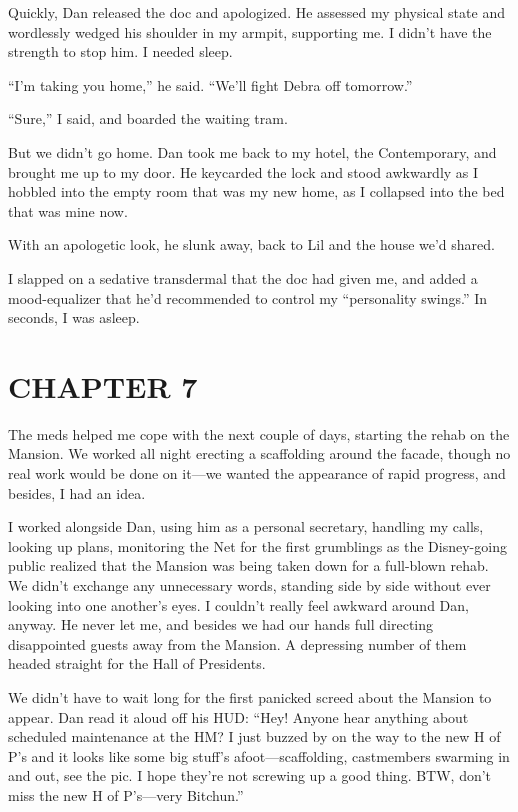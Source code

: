 Quickly, Dan released the doc and apologized. He assessed my
physical state and wordlessly wedged his shoulder in my armpit,
supporting me. I didn't have the strength to stop him. I needed
sleep.

“I'm taking you home,” he said. “We'll fight Debra off tomorrow.”

“Sure,” I said, and boarded the waiting tram.

But we didn't go home. Dan took me back to my hotel, the
Contemporary, and brought me up to my door. He keycarded the lock
and stood awkwardly as I hobbled into the empty room that was my
new home, as I collapsed into the bed that was mine now.

With an apologetic look, he slunk away, back to Lil and the house
we'd shared.

I slapped on a sedative transdermal that the doc had given me, and
added a mood-equalizer that he'd recommended to control my
“personality swings.” In seconds, I was asleep.

\section{CHAPTER 7}

The meds helped me cope with the next couple of days, starting the
rehab on the Mansion. We worked all night erecting a scaffolding
around the facade, though no real work would be done on it—we
wanted the appearance of rapid progress, and besides, I had an
idea.

I worked alongside Dan, using him as a personal secretary, handling
my calls, looking up plans, monitoring the Net for the first
grumblings as the Disney-going public realized that the Mansion was
being taken down for a full-blown rehab. We didn't exchange any
unnecessary words, standing side by side without ever looking into
one another's eyes. I couldn't really feel awkward around Dan,
anyway. He never let me, and besides we had our hands full
directing disappointed guests away from the Mansion. A depressing
number of them headed straight for the Hall of Presidents.

We didn't have to wait long for the first panicked screed about the
Mansion to appear. Dan read it aloud off his HUD: “Hey! Anyone hear
anything about scheduled maintenance at the HM? I just buzzed by on
the way to the new H of P's and it looks like some big stuff's
afoot—scaffolding, castmembers swarming in and out, see the pic. I
hope they're not screwing up a good thing. BTW, don't miss the new
H of P's—very Bitchun.”

